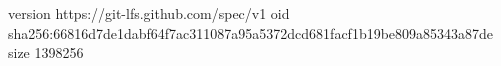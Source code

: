 version https://git-lfs.github.com/spec/v1
oid sha256:66816d7de1dabf64f7ac311087a95a5372dcd681facf1b19be809a85343a87de
size 1398256
